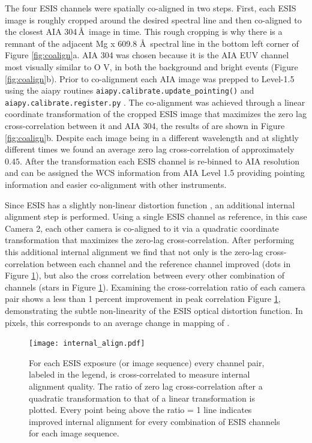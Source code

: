 {   		The four ESIS channels were spatially co-aligned in two steps.  
   		First, each ESIS image is roughly cropped around the desired spectral line and then co-aligned to the closest AIA 304\,\AA\ image in time.
   		This rough cropping is why there is a remnant of the adjacent Mg {\sc x} 609.8 \AA \ spectral line in the bottom left corner of Figure \ref{fig:coalign}a.
   		AIA 304 was chosen because it is the AIA EUV channel most visually similar to O V, in both the background and bright events (Figure \ref{fig:coalign}b).
   		Prior to co-alignment each AIA image was prepped to Level-1.5 using the aiapy routines \texttt{aiapy.calibrate.update\_pointing()} and \texttt{aiapy.calibrate.register.py}  \citep{aiapy}.
   		The co-alignment was achieved through a linear coordinate transformation of the cropped ESIS image that maximizes the zero lag cross-correlation between it and AIA 304, the results of are shown in Figure \ref{fig:coalign}b.
   		Despite each image being in a different wavelength and at slightly different times we found an average zero lag cross-correlation of approximately $0.45$.
   		After the transformation each ESIS channel is re-binned to AIA resolution and can be assigned the WCS  information from AIA Level 1.5 providing pointing information and easier co-alignment with other instruments.

    	Since ESIS has a slightly non-linear distortion function \citep{ESIS}, an additional internal alignment step is performed.
    	Using a single ESIS channel as reference, in this case Camera 2, each other camera is co-aligned to it via a quadratic coordinate transformation that maximizes the zero-lag cross-correlation. 
    	After performing this additional internal alignment we find that not only is the zero-lag cross-correlation between each channel and the reference channel improved (dots in Figure \ref{fig:cc}), but also the cross correlation between every other combination of channels (stars in Figure \ref{fig:cc}).
    	Examining the cross-correlation ratio of each camera pair shows a less than 1 percent improvement in peak correlation Figure \ref{fig:cc}, demonstrating the subtle non-linearity of the ESIS optical distortion function.
    	In pixels, this corresponds to an average change in mapping of .
    	
     	\begin{figure}[htb!]
    		\centering
    		\texttt{[image: internal\_align.pdf]}
    		\caption{For each ESIS exposure (or image sequence) every channel pair, labeled in the legend, is cross-correlated to measure internal alignment quality.  The ratio of zero lag cross-correlation after a quadratic transformation to that of a linear transformation is plotted.  Every point being above the ratio = 1 line indicates improved internal alignment for every combination of ESIS channels for each image sequence.}
    		\label{fig:cc}	
    	\end{figure}
    	
}
